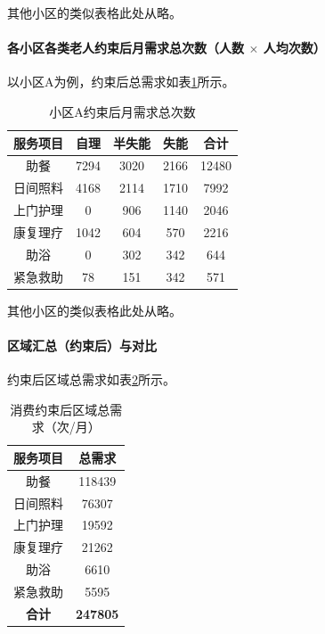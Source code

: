 \documentclass[UTF8]{ctexart}
\begin{document}
其他小区的类似表格此处从略。

\paragraph{各小区各类老人约束后月需求总次数（人数 $\times$ 人均次数）}
以小区A为例，约束后总需求如表\ref{tab:constrained_total_A}所示。

\begin{table}[H]
\centering
\caption{小区A约束后月需求总次数}
\label{tab:constrained_total_A}
\renewcommand{\arraystretch}{1.3}
\begin{tabular}{|c|c|c|c|c|}
\hline
\textbf{服务项目} & \textbf{自理} & \textbf{半失能} & \textbf{失能} & \textbf{合计} \\
\hline
助餐 & 7294 & 3020 & 2166 & 12480 \\
\hline
日间照料 & 4168 & 2114 & 1710 & 7992 \\
\hline
上门护理 & 0 & 906 & 1140 & 2046 \\
\hline
康复理疗 & 1042 & 604 & 570 & 2216 \\
\hline
助浴 & 0 & 302 & 342 & 644 \\
\hline
紧急救助 & 78 & 151 & 342 & 571 \\
\hline
\end{tabular}
\end{table}

其他小区的类似表格此处从略。

\paragraph{区域汇总（约束后）与对比}
约束后区域总需求如表\ref{tab:constrained_region}所示。

\begin{table}[H]
\centering
\caption{消费约束后区域总需求（次/月）}
\label{tab:constrained_region}
\renewcommand{\arraystretch}{1.3}
\begin{tabular}{|c|c|}
\hline
\textbf{服务项目} & \textbf{总需求} \\
\hline
助餐 & 118439 \\
\hline
日间照料 & 76307 \\
\hline
上门护理 & 19592 \\
\hline
康复理疗 & 21262 \\
\hline
助浴 & 6610 \\
\hline
紧急救助 & 5595 \\
\hline
\textbf{合计} & \textbf{247805} \\
\hline
\end{tabular}
\end{table}
\end{document}
